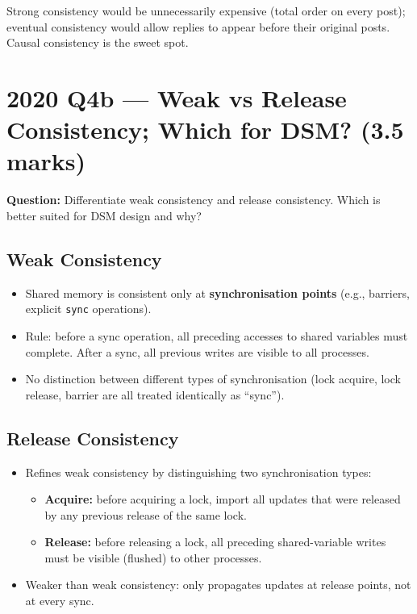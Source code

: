 \documentclass[12pt,a4paper]{article}
\begin{document}
Strong consistency would be unnecessarily expensive (total order on every post); eventual consistency would allow replies to appear before their original posts. Causal consistency is the sweet spot.

\section{2020 Q4b --- Weak vs Release Consistency; Which for DSM? (3.5 marks)}

\textbf{Question:} Differentiate weak consistency and release consistency. Which is better suited for DSM design and why?

\subsection*{Weak Consistency}

\begin{itemize}[noitemsep]
  \item Shared memory is consistent only at \textbf{synchronisation points} (e.g., barriers, explicit \texttt{sync} operations).
  \item Rule: before a sync operation, all preceding accesses to shared variables must complete. After a sync, all previous writes are visible to all processes.
  \item No distinction between different types of synchronisation (lock acquire, lock release, barrier are all treated identically as ``sync'').
\end{itemize}

\subsection*{Release Consistency}

\begin{itemize}[noitemsep]
  \item Refines weak consistency by distinguishing two synchronisation types:
    \begin{itemize}[noitemsep]
      \item \textbf{Acquire:} before acquiring a lock, import all updates that were released by any previous release of the same lock.
      \item \textbf{Release:} before releasing a lock, all preceding shared-variable writes must be visible (flushed) to other processes.
    \end{itemize}
  \item Weaker than weak consistency: only propagates updates at release points, not at every sync.
\end{itemize}
\end{document}
